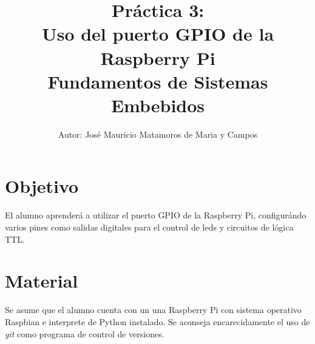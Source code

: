 \documentclass[letterpaper,10.5pt]{article}
\author{\footnotesize Autor: José Mauricio Matamoros de Maria y Campos}
\title{Práctica 3:\\Uso del puerto GPIO de la Raspberry Pi\\
{\large Fundamentos de Sistemas Embebidos}}
\date{}
\begin{document}
\maketitle

\section{Objetivo}%
\label{sec:objective}
El alumno aprenderá a utilizar el puerto GPIO de la Raspberry Pi, configurándo varios pines como salidas digitales para el control de leds y circuitos de lógica TTL.%


\section{Material}%
\label{sec:material}
Se asume que el alumno cuenta con un una Raspberry Pi con sistema operativo Raspbian e interprete de Python instalado. Se aconseja encarecidamente el uso de \textit{git} como programa de control de versiones.
\end{document}
